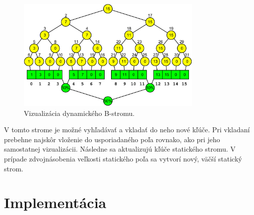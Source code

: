 \begin{figure}
    \centering
    \includegraphics[width=0.8\textwidth]{figures/screenshots/cobtree_overview.pdf}
    \caption[Vizualizácia dynamického \obliv B-stromu]{Vizualizácia dynamického \obliv B-stromu.}
    \label{fig:ss_cobtree}
\end{figure}

V tomto strome je možné vyhľadávať a vkladať do neho nové kľúče. Pri vkladaní prebehne najskôr vloženie do usporiadaného poľa rovnako, ako pri jeho samostatnej vizualizácii. Následne sa aktualizujú kľúče statického stromu. V prípade zdvojnásobenia veľkosti statického poľa sa vytvorí nový, väčší statický strom.


\section{Implementácia}

